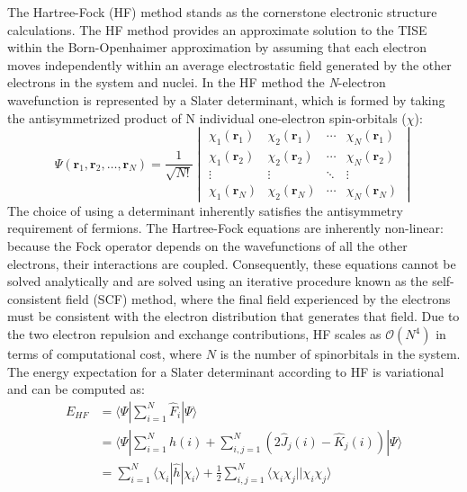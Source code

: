 The Hartree-Fock (HF) method stands as the cornerstone electronic structure calculations\cite{szabo1996modern}. The HF method provides an approximate solution to the TISE within the Born-Openhaimer approximation by assuming that each electron moves independently within an average electrostatic field generated by the other electrons in the system and nuclei. In the HF method the \textit{N}-electron wavefunction is represented by a Slater determinant, which is formed by taking the antisymmetrized product of N individual one-electron spin-orbitals ($\chi$):
\begin{equation}\label{eq:SlaterDet}
    \Psi(\mathbf{r}_1, \mathbf{r}_2, \dots, \mathbf{r}_N) = \frac{1}{\sqrt{N!}}
    \begin{vmatrix}
      \chi_1(\mathbf{r}_1) & \chi_2(\mathbf{r}_1) & \cdots & \chi_N(\mathbf{r}_1) \\
      \chi_1(\mathbf{r}_2) & \chi_2(\mathbf{r}_2) & \cdots & \chi_N(\mathbf{r}_2) \\
      \vdots & \vdots & \ddots & \vdots \\
      \chi_1(\mathbf{r}_N) & \chi_2(\mathbf{r}_N) & \cdots & \chi_N(\mathbf{r}_N)
    \end{vmatrix}
  \end{equation}
The choice of using a determinant inherently satisfies the antisymmetry requirement of fermions. The Hartree-Fock equations are inherently non-linear: because the Fock operator depends on the wavefunctions of all the other electrons, their interactions are coupled. Consequently, these equations cannot be solved analytically and are solved using an iterative procedure known as the self-consistent field (SCF) method, where the final field experienced by the electrons must be consistent with the electron distribution that generates that field. Due to the two electron repulsion and exchange contributions, HF scales as $\mathcal{O}(N^4)$ in terms of computational cost, where $N$ is the number of spinorbitals in the system.
\iffalse 
The energy expectation for a Slater determinant according to HF is variational and can be computed as:
\begin{equation}\label{EHF}
    \begin{aligned}
        E_{HF} &= \langle \Psi | \sum_{i=1}^{N} \hat{F}_i  | \Psi \rangle \\
            &= \langle \Psi | \sum_{i=1}^{N} \hat{h}(i) + \sum_{i,j=1}^{N} (2\hat{J}_j(i) - \hat{K}_j(i)) | \Psi \rangle\\ 
            &= \sum_{i=1}^{N} \langle \chi_i | \hat{h} | \chi_i \rangle + \frac{1}{2} \sum_{i,j=1}^{N} \langle \chi_i \chi_j || \chi_i \chi_j \rangle
    \end{aligned}
\end{equation}
